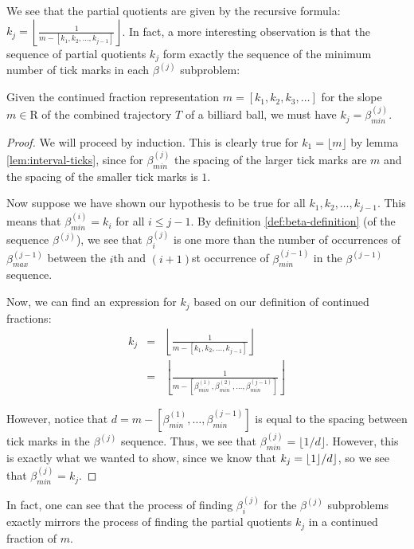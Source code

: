 We see that the partial quotients are given by the recursive formula: $k_j = \left\lfloor \frac{1}{m - [k_1, k_2, \ldots, k_{j-1}]} \right\rfloor$. In fact, a more interesting observation is that the sequence of partial quotients $k_j$ form exactly the sequence of the minimum number of tick marks in each $\beta^{(j)}$ subproblem:

\begin{theorem}
  Given the continued fraction representation $m = [k_1, k_2, k_3, \ldots]$ for the slope $m \in \mathrm{R}$ of the combined trajectory $T$ of a billiard ball, we must have $k_j = \beta_{min}^{(j)}$.
\end{theorem}
\begin{proof}
  We will proceed by induction. This is clearly true for $k_1 = \lfloor m \rfloor$ by lemma \ref{lem:interval-ticks}, since for $\beta_{min}^{(j)}$ the spacing of the larger tick marks are $m$ and the spacing of the smaller tick marks is $1$.

  Now suppose we have shown our hypothesis to be true for all $k_1, k_2, \ldots, k_{j-1}$. This means that $\beta_{min}^{(i)} = k_{i}$ for all $i \leq j-1$. By definition \ref{def:beta-definition} (of the sequence $\beta^{(j)}$), we see that $\beta_i^{(j)}$ is one more than the number of occurrences of $\beta^{(j-1)}_{max}$ between the $i$th and $(i+1)$st occurrence of $\beta^{(j-1)}_{min}$ in the $\beta^{(j-1)}$ sequence.

  Now, we can find an expression for $k_{j}$ based on our definition of continued fractions:
  \begin{eqnarray}
    k_j &=& \left\lfloor \frac{1}{m - [k_1, k_2, \ldots, k_{j-1}]} \right\rfloor \\
        &=& \left\lfloor \frac{1}{m - [\beta_{min}^{(1)}, \beta_{min}^{(2)}, \ldots, \beta_{min}^{(j-1)}]} \right\rfloor
  \end{eqnarray}

  However, notice that $d = m - [\beta_{min}^{(1)}, \ldots, \beta_{min}^{(j-1)}]$ is equal to the spacing between tick marks in the $\beta^{(j)}$ sequence. Thus, we see that $\beta_{min}^{(j)} = \lfloor 1/d \rfloor$. However, this is exactly what we wanted to show, since we know that $k_j = \floor 1/d \rfloor$, so we see that $\beta_{min}^{(j)} = k_j$.
\end{proof}

In fact, one can see that the process of finding $\beta^{(j)}_i$ for the $\beta^{(j)}$ subproblems exactly mirrors the process of finding the partial quotients $k_j$ in a continued fraction of $m$.

